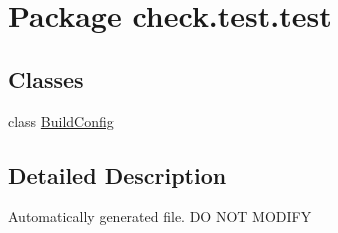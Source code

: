 \hypertarget{namespacecheck_1_1test_1_1test}{}\section{Package check.\+test.\+test}
\label{namespacecheck_1_1test_1_1test}
\subsection*{Classes}
\begin{DoxyCompactItemize}
\item 
class \hyperlink{classcheck_1_1test_1_1test_1_1_build_config}{Build\+Config}
\end{DoxyCompactItemize}


\subsection{Detailed Description}
Automatically generated file. D\+O N\+O\+T M\+O\+D\+I\+F\+Y 